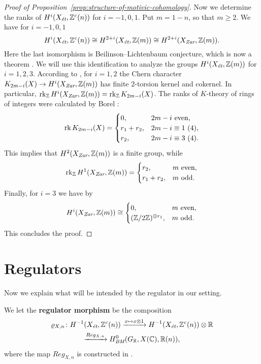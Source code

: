 \documentclass[draft]{article}
\numberwithin{equation}{section}
\begin{document}
\begin{proof}[Proof of Proposition~\ref{prop:structure-of-motivic-cohomology}]
  Now we determine the ranks of $H^i (X_\et, \ZZ^c (n))$ for $i = -1,0,1$.
  Put $m = 1-n$, so that $m \ge 2$. We have for $i = -1,0,1$
  \[ H^i (X_\et, \ZZ^c(n)) \cong
    H^{2+i} (X_\et, \ZZ (m)) \cong
    H^{2+i} (X_\Zar, \ZZ(m)). \]
  Here the last isomorphism is Beilinson--Lichtenbaum conjecture,
  which is now a theorem \cite[Theorem~1.2]{Geisser-2004-Dedekind}.
  We will use this identification to analyze
  the groups $H^i (X_\et, \ZZ (m))$ for $i = 1,2,3$. According to
  \cite[Proposition~2.1]{Kolster-Sands-2008}, for $i = 1,2$ the Chern
  character
  $K_{2m - i} (X) \to H^i (X_\Zar, \ZZ(m))$
  has finite $2$-torsion kernel and cokernel. In particular,
  $\rk_\ZZ H^i (X_\Zar, \ZZ(m)) = \rk_\ZZ K_{2m - i} (X)$.
  The ranks of $K$-theory of rings of integers were calculated by Borel
  \cite{Borel-1974}:
  \[ \rk K_{2m-i} (X) = \begin{cases}
      0, & 2m - i \text{ even}, \\
      r_1 + r_2, & 2m - i \equiv 1 ~ (4), \\
      r_2, & 2m - i \equiv 3 ~ (4).
    \end{cases} \]
  This implies that $H^2 (X_\Zar, \ZZ(m))$ is a finite group, while
  \[ \rk_\ZZ H^1 (X_\Zar, \ZZ(m)) =
    \begin{cases}
      r_2, & m \text{ even}, \\
      r_1 + r_2, & m \text{ odd}.
    \end{cases} \]
  Finally, for $i = 3$ we have by \cite[p.\,179]{Kolster-Sands-2008}
  \[ H^i (X_\Zar, \ZZ (m)) \cong
    \begin{cases}
      0, & m\text{ even}, \\
      (\ZZ/2\ZZ)^{\oplus r_1}, & m\text{ odd}.
    \end{cases} \]
  This concludes the proof.
\end{proof}


\section{Regulators}
\label{sec:regulators}

Now we explain what will be intended by the regulator in our setting.

\begin{definition}
  We let the \textbf{regulator morphism} be the composition
  \begin{multline*}
    \varrho_{X,n}\colon
    H^{-1} (X_\et, \ZZ^c (n)) \xrightarrow{x \mapsto x\otimes 1}
    H^{-1} (X_\et, \ZZ^c (n)) \otimes \RR \\
    \xrightarrow{Reg_{X,n}} H^0_\BM (G_\RR, X(\CC), \RR(n)),
  \end{multline*}
  where the map $Reg_{X,n}$ is constructed in
  \cite[\S 2]{Beshenov-Weil-etale-2}.
\end{definition}
\end{document}
